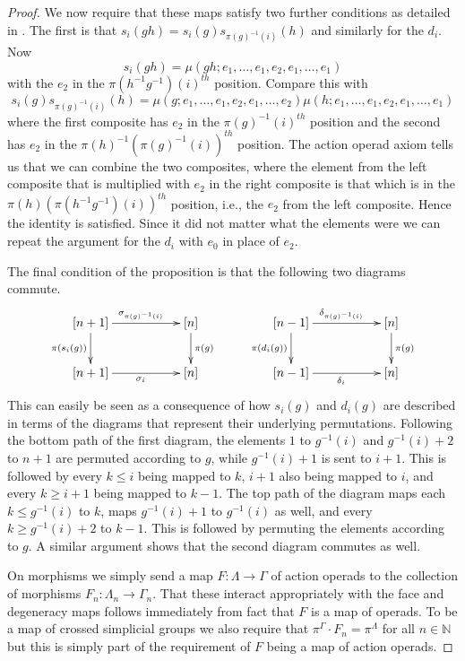 \documentclass[11pt]{article}
\theoremstyle{definition}
\theoremstyle{plain}
\begin{document}
\begin{proof}
    We now require that these maps satisfy two further conditions as detailed in \cite{FL91}. The first is that $s_i (gh) = s_i(g) s_{\pi(g)^{-1}(i)}(h)$ and similarly for the $d_i$. Now
        \[
            s_i(gh) = \mu(gh; e_1, \ldots, e_1, e_2, e_1, \ldots, e_1)
        \]
    with the $e_2$ in the $\pi(h^{-1}g^{-1})(i)^{th}$ position. Compare this with
        \[
            s_i(g)s_{\pi(g)^{-1}(i)}(h) = \mu(g; e_1, \ldots, e_1, e_2, e_1, \ldots, e_2) \mu(h; e_1, \ldots, e_1, e_2, e_1, \ldots, e_1)
        \]
    where the first composite has $e_2$ in the $\pi(g)^{-1}(i)^{th}$ position and the second has $e_2$ in the $\pi(h)^{-1}(\pi(g)^{-1}(i))^{th}$ position. The action operad axiom tells us that we can combine the two composites, where the element from the left composite that is multiplied with $e_2$ in the right composite is that which is in the $\pi(h)(\pi(h^{-1}g^{-1})(i))^{th}$ position, i.e., the $e_2$ from the left composite. Hence the identity is satisfied. Since it did not matter what the elements were we can repeat the argument for the $d_i$ with $e_0$ in place of $e_2$.
    
    The final condition of the proposition is that the following two diagrams commute.
        \[
            \xymatrix{
                [n + 1] \ar[rr]^{\sigma_{\pi(g)^{-1}(i)}} \ar[d]_{\pi(s_i(g))} & & [n] \ar[d]^{\pi(g)} & & [n - 1] \ar[rr]^{\delta_{\pi(g)^{-1}(i)}} \ar[d]_{\pi(d_i(g))} & & [n] \ar[d]^{\pi(g)} \\
                [n+1] \ar[rr]_{\sigma_i} && [n] & & [n-1] \ar[rr]_{\delta_i} & & [n]
            }
        \]
    This can easily be seen as a consequence of how $s_i(g)$ and $d_i(g)$ are described in terms of the diagrams that represent their underlying permutations. Following the bottom path of the first diagram, the elements $1$ to $g^{-1}(i)$ and $g^{-1}(i)+2$ to $n+1$ are permuted according to $g$, while $g^{-1}(i) + 1$ is sent to $i +1$. This is followed by every $k \leq i$ being mapped to $k$, $i +1$ also being mapped to $i$, and every $k \geq i + 1$ being mapped to $k-1$. The top path of the diagram maps each $k \leq g^{-1}(i)$ to $k$, maps $g^{-1}(i)+1$ to $g^{-1}(i)$ as well, and every $k \geq g^{-1}(i) + 2$ to $k-1$. This is followed by permuting the elements according to $g$. A similar argument shows that the second diagram commutes as well.
    
    On morphisms we simply send a map $F \colon \Lambda \rightarrow \Gamma$ of action operads to the collection of morphisms $F_n \colon \Lambda_n \rightarrow \Gamma_n$. That these interact appropriately with the face and degeneracy maps follows immediately from fact that $F$ is a map of operads. To be a map of crossed simplicial groups we also require that $\pi^{\Gamma} \cdot F_n = \pi^{\Lambda}$ for all $n \in \mathbb{N}$ but this is simply part of the requirement of $F$ being a map of action operads.
\end{proof}


\end{document}
